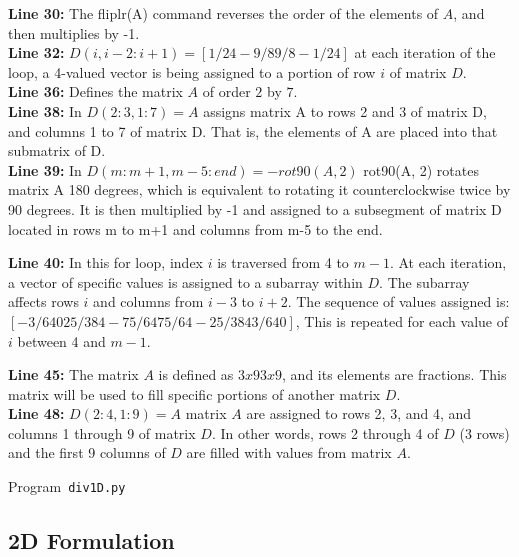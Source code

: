 \textbf{Line 30:} The fliplr(A) command reverses the order of the elements of $A$, and then multiplies by -1.\\

\textbf{Line 32:} $D(i, i-2:i+1) = [1/24 -9/8 9/8 -1/24]$ at each iteration of the loop, a 4-valued vector is being assigned to a portion of row $i$ of matrix $D$.\\


\textbf{Line 36:} Defines the matrix $A$ of order $2$ by $7$.\\


\textbf{Line 38:} In $D(2:3, 1:7) = A$ assigns matrix A to rows 2 and 3 of matrix D, and columns 1 to 7 of matrix D. That is, the elements of A are placed into that submatrix of D.\\


\textbf{Line 39:} In $D(m:m+1, m-5:end) = -rot90(A,2)$ rot90(A, 2) rotates matrix A 180 degrees, which is equivalent to rotating it counterclockwise twice by 90 degrees. It is then multiplied by -1 and assigned to a subsegment of matrix D located in rows m to m+1 and columns from m-5 to the end.


\textbf{Line 40:} In this for loop, index $i$ is traversed from 4 to $m-1$. At each iteration, a vector of specific values ​​is assigned to a subarray within $D$. The subarray affects rows $i$ and columns from $i-3$ to $i+2$. The sequence of values ​​assigned is: $[-3/640 25/384 -75/64 75/64 -25/384 3/640]$, This is repeated for each value of $i$ between 4 and $m-1$.

\textbf{Line 45:} The matrix $A$ is defined as $3x93x9$, and its elements are fractions. This matrix will be used to fill specific portions of another matrix $D$.\\

\textbf{Line 48:} $D(2:4, 1:9) = A$ matrix $A$ are assigned to rows 2, 3, and 4, and columns 1 through 9 of matrix $D$. In other words, rows 2 through 4 of $D$ (3 rows) and the first 9 columns of $D$ are filled with values ​​from matrix $A$.


\begin{pythonlisting}
	\tiny
	\centering
	\caption{Program~\texttt{div1D.py}}
	\label{code:div1D.py}
\end{pythonlisting}

\subsection{2D Formulation}


